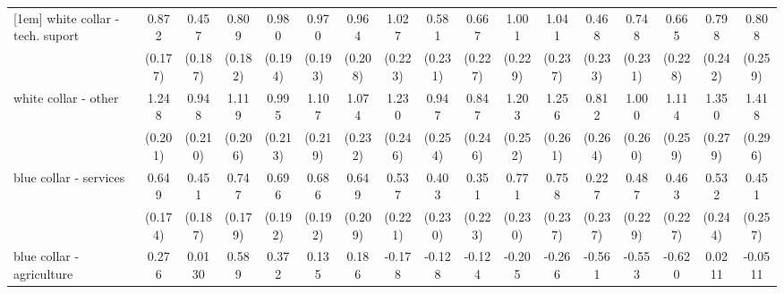 {\begin{tabular}{l*{16}{c}}
[1em]
white collar - tech. suport&       0.872\sym{***}&       0.457\sym{*}  &       0.809\sym{***}&       0.980\sym{***}&       0.970\sym{***}&       0.964\sym{***}&       1.027\sym{***}&       0.581\sym{*}  &       0.667\sym{**} &       1.001\sym{***}&       1.041\sym{***}&       0.468\sym{*}  &       0.748\sym{**} &       0.665\sym{**} &       0.798\sym{***}&       0.808\sym{**} \\
                    &     (0.177)         &     (0.187)         &     (0.182)         &     (0.194)         &     (0.193)         &     (0.208)         &     (0.223)         &     (0.231)         &     (0.227)         &     (0.229)         &     (0.237)         &     (0.233)         &     (0.231)         &     (0.228)         &     (0.242)         &     (0.259)         \\
[1em]
white collar - other&       1.248\sym{***}&       0.948\sym{***}&       1.119\sym{***}&       0.995\sym{***}&       1.107\sym{***}&       1.074\sym{***}&       1.230\sym{***}&       0.947\sym{***}&       0.847\sym{***}&       1.203\sym{***}&       1.256\sym{***}&       0.812\sym{**} &       1.000\sym{***}&       1.114\sym{***}&       1.350\sym{***}&       1.418\sym{***}\\
                    &     (0.201)         &     (0.210)         &     (0.206)         &     (0.213)         &     (0.219)         &     (0.232)         &     (0.246)         &     (0.254)         &     (0.246)         &     (0.252)         &     (0.261)         &     (0.264)         &     (0.260)         &     (0.259)         &     (0.279)         &     (0.296)         \\
[1em]
blue collar - services&       0.649\sym{***}&       0.451\sym{*}  &       0.747\sym{***}&       0.696\sym{***}&       0.686\sym{***}&       0.649\sym{**} &       0.537\sym{*}  &       0.403         &       0.351         &       0.771\sym{***}&       0.758\sym{**} &       0.227         &       0.487\sym{*}  &       0.463\sym{*}  &       0.532\sym{*}  &       0.451         \\
                    &     (0.174)         &     (0.187)         &     (0.179)         &     (0.192)         &     (0.192)         &     (0.209)         &     (0.221)         &     (0.230)         &     (0.223)         &     (0.230)         &     (0.237)         &     (0.237)         &     (0.229)         &     (0.227)         &     (0.244)         &     (0.257)         \\
[1em]
blue collar - agriculture&       0.276         &      0.0130         &       0.589\sym{*}  &       0.372         &       0.135         &       0.186         &      -0.178         &      -0.128         &      -0.124         &      -0.205         &      -0.266         &      -0.561         &      -0.553         &      -0.620         &      0.0211         &     -0.0511         \\

\end{tabular}}
